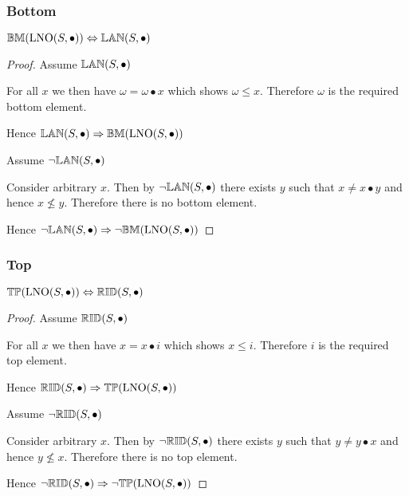\documentclass[../Summary.tex]{subfiles}
\begin{document}
\subsubsection{Bottom}

\begin{theorem} \label{thm:lno_bottom}
${\mathbb{BM}}(\mathrm{LNO}(S,\bullet)) \Leftrightarrow {\mathbb{LAN}}(S, \bullet)$
\end{theorem}

\begin{proof}

\vspace{0.5em}

Assume ${\mathbb{LAN}}(S,\bullet)$
\begin{ind}
For all $x$ we then have $\omega = \omega \bullet x$ which shows $\omega \leq x$. Therefore $\omega$ is the required bottom element.
\end{ind}
Hence ${\mathbb{LAN}}(S,\bullet) \Rightarrow {\mathbb{BM}}(\mathrm{LNO}(S,\bullet))$

\vspace{2em}

Assume $\neg {\mathbb{LAN}}(S,\bullet)$
\begin{ind}
Consider arbitrary $x$. Then by $\neg {\mathbb{LAN}}(S,\bullet)$ there exists $y$ such that $x \neq x \bullet y$ and hence $x \nleq y$. Therefore there is no bottom element.
\end{ind}
Hence $\neg {\mathbb{LAN}}(S,\bullet) \Rightarrow \neg {\mathbb{BM}}(\mathrm{LNO}(S,\bullet))$
\end{proof}




\subsubsection{Top}

\begin{theorem} \label{thm:lno_top}
${\mathbb{TP}}(\mathrm{LNO}(S,\bullet)) \Leftrightarrow {\mathbb{RID}}(S, \bullet)$
\end{theorem}

\begin{proof}

\vspace{0.5em}

Assume ${\mathbb{RID}}(S,\bullet)$
\begin{ind}
For all $x$ we then have $x = x \bullet i$ which shows $x \leq i$. Therefore $i$ is the required top element.
\end{ind}
Hence ${\mathbb{RID}}(S,\bullet) \Rightarrow {\mathbb{TP}}(\mathrm{LNO}(S,\bullet))$

\vspace{2em}

Assume $\neg {\mathbb{RID}}(S,\bullet)$
\begin{ind}
Consider arbitrary $x$. Then by $\neg {\mathbb{RID}}(S,\bullet)$ there exists $y$ such that $y \neq y \bullet x$ and hence $y \nleq x$. Therefore there is no top element.
\end{ind}
Hence $\neg {\mathbb{RID}}(S,\bullet) \Rightarrow \neg {\mathbb{TP}}(\mathrm{LNO}(S,\bullet))$
\end{proof}
\end{document}
